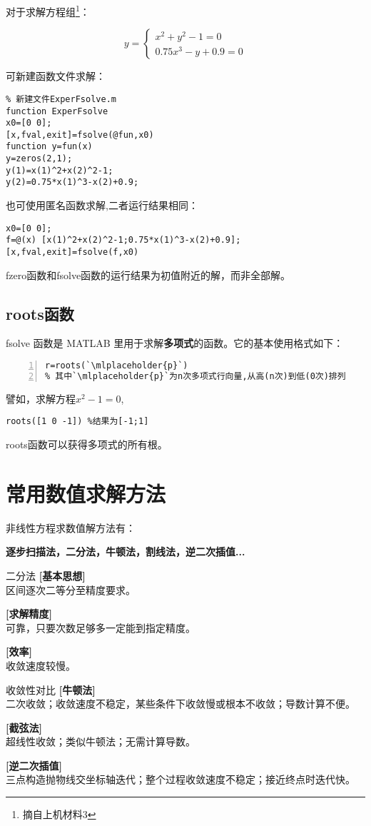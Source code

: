 对于求解方程组\footnote{摘自上机材料3}：

\[ y =
\begin{cases}
x^2+y^2-1=0\\
0.75x^3-y+0.9=0
\end{cases} \]

可新建函数文件求解：

\begin{lstlisting}
% 新建文件ExperFsolve.m
function ExperFsolve
x0=[0 0];
[x,fval,exit]=fsolve(@fun,x0)
function y=fun(x)
y=zeros(2,1);
y(1)=x(1)^2+x(2)^2-1;
y(2)=0.75*x(1)^3-x(2)+0.9;
\end{lstlisting}

也可使用匿名函数求解,二者运行结果相同：
\begin{lstlisting}
x0=[0 0]; 
f=@(x) [x(1)^2+x(2)^2-1;0.75*x(1)^3-x(2)+0.9];
[x,fval,exit]=fsolve(f,x0)
\end{lstlisting}

\begin{note}
fzero函数和fsolve函数的运行结果为初值附近的解，而非全部解。
\end{note}
\subsection{roots函数}\label{ployp}
fsolve 函数是 MATLAB 里用于求解\textcolor{third}{\textbf{多项式}}的函数。它的基本使用格式如下：
\begin{lstlisting}[frame=single,numbers=left]
r=roots(`\mlplaceholder{p}`)
% 其中`\mlplaceholder{p}`为n次多项式行向量,从高(n次)到低(0次)排列
\end{lstlisting}
譬如，求解方程$x^2-1=0$,
\begin{lstlisting}
roots([1 0 -1]) %结果为[-1;1]
\end{lstlisting}
\begin{note}
roots函数可以获得多项式的所有根。
\end{note}

\newpage
\section{常用数值求解方法}
非线性方程求数值解方法有：

\textbf{逐步扫描法，二分法，牛顿法，割线法，逆二次插值...}

\begin{definition}{二分法}{}
\textbf{[基本思想]}\\
区间逐次二等分至精度要求。

\textbf{[求解精度]}\\
可靠，只要次数足够多一定能到指定精度。

\textbf{[效率]}\\
收敛速度较慢。
\end{definition}

\begin{proposition}{收敛性对比}{}
\textbf{[牛顿法]}\\
二次收敛；收敛速度不稳定，某些条件下收敛慢或根本不收敛；导数计算不便。

\textbf{[截弦法]}\\
超线性收敛；类似牛顿法；无需计算导数。

\textbf{[逆二次插值]}\\
三点构造抛物线交坐标轴迭代；整个过程收敛速度不稳定；接近终点时迭代快。
\end{proposition}